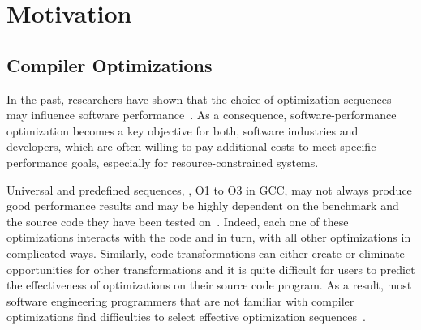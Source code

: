 






\section{Motivation}
\subsection{Compiler Optimizations}
In the past, researchers have shown that the choice of optimization sequences may influence software performance~\cite{almagor2004finding,chen2012deconstructing}. 
As a consequence, software-performance optimization becomes a key objective for both, software industries and developers, which are often willing to pay additional costs to meet specific performance goals, especially for resource-constrained systems.

Universal and predefined sequences, \eg, O1 to O3 in GCC, may not always produce good performance results and may be highly dependent on the benchmark and the source code they have been tested on~\cite{hoste2008cole,chen2010evaluating,escobar2015evaluation}.
Indeed, each one of these optimizations interacts with the code and in turn, with all other optimizations in complicated ways. Similarly, code transformations can either create or eliminate opportunities for other transformations and it is quite difficult for users to predict the effectiveness of optimizations on their source code program.
As a result, most software engineering programmers that are not familiar with compiler optimizations find difficulties to select effective optimization sequences~\cite{almagor2004finding}.

